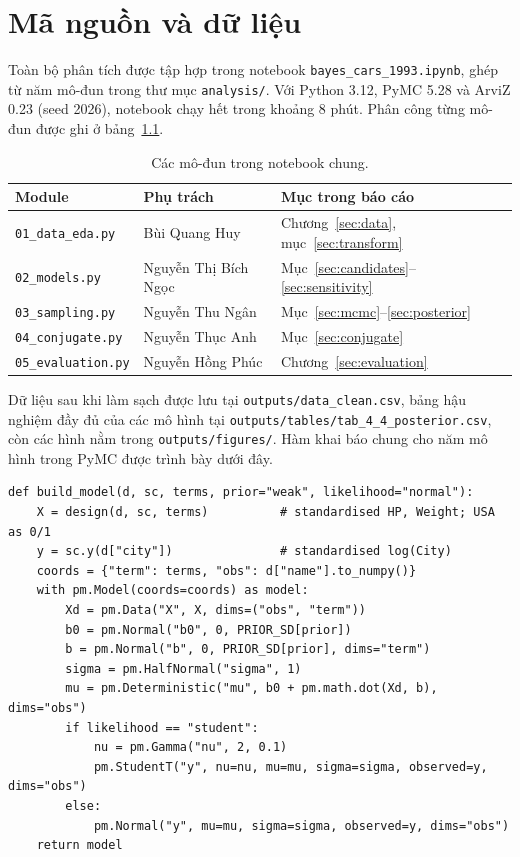 \documentclass[12pt,a4paper]{report}
\begin{document}
\chapter{Mã nguồn và dữ liệu}
\label{sec:appendix}

Toàn bộ phân tích được tập hợp trong notebook \texttt{bayes\_cars\_1993.ipynb},
ghép từ năm mô-đun trong thư mục \texttt{analysis/}. Với Python 3.12, PyMC 5.28
và ArviZ 0.23 (seed 2026), notebook chạy hết trong khoảng 8 phút. Phân công từng
mô-đun được ghi ở bảng~\ref{tab:modules}.

\begin{table}[tp]
  \centering
  \caption{Các mô-đun trong notebook chung.}
  \label{tab:modules}
  \begin{tabular}{lll}
    \toprule
    Module & Phụ trách & Mục trong báo cáo \\
    \midrule
    \texttt{01\_data\_eda.py}   & Bùi Quang Huy & Chương~\ref{sec:data}, mục~\ref{sec:transform} \\
    \texttt{02\_models.py}      & Nguyễn Thị Bích Ngọc & Mục~\ref{sec:candidates}--\ref{sec:sensitivity} \\
    \texttt{03\_sampling.py}    & Nguyễn Thu Ngân & Mục~\ref{sec:mcmc}--\ref{sec:posterior} \\
    \texttt{04\_conjugate.py}   & Nguyễn Thục Anh & Mục~\ref{sec:conjugate} \\
    \texttt{05\_evaluation.py}  & Nguyễn Hồng Phúc & Chương~\ref{sec:evaluation} \\
    \bottomrule
  \end{tabular}
\end{table}

Dữ liệu sau khi làm sạch được lưu tại \texttt{outputs/data\_clean.csv}, bảng hậu
nghiệm đầy đủ của các mô hình tại
\texttt{outputs/tables/tab\_4\_4\_posterior.csv}, còn các hình nằm trong
\texttt{outputs/figures/}. Hàm khai báo chung cho năm mô hình trong PyMC được
trình bày dưới đây.

\begin{lstlisting}
def build_model(d, sc, terms, prior="weak", likelihood="normal"):
    X = design(d, sc, terms)          # standardised HP, Weight; USA as 0/1
    y = sc.y(d["city"])               # standardised log(City)
    coords = {"term": terms, "obs": d["name"].to_numpy()}
    with pm.Model(coords=coords) as model:
        Xd = pm.Data("X", X, dims=("obs", "term"))
        b0 = pm.Normal("b0", 0, PRIOR_SD[prior])
        b = pm.Normal("b", 0, PRIOR_SD[prior], dims="term")
        sigma = pm.HalfNormal("sigma", 1)
        mu = pm.Deterministic("mu", b0 + pm.math.dot(Xd, b), dims="obs")
        if likelihood == "student":
            nu = pm.Gamma("nu", 2, 0.1)
            pm.StudentT("y", nu=nu, mu=mu, sigma=sigma, observed=y, dims="obs")
        else:
            pm.Normal("y", mu=mu, sigma=sigma, observed=y, dims="obs")
    return model
\end{lstlisting}
\end{document}
